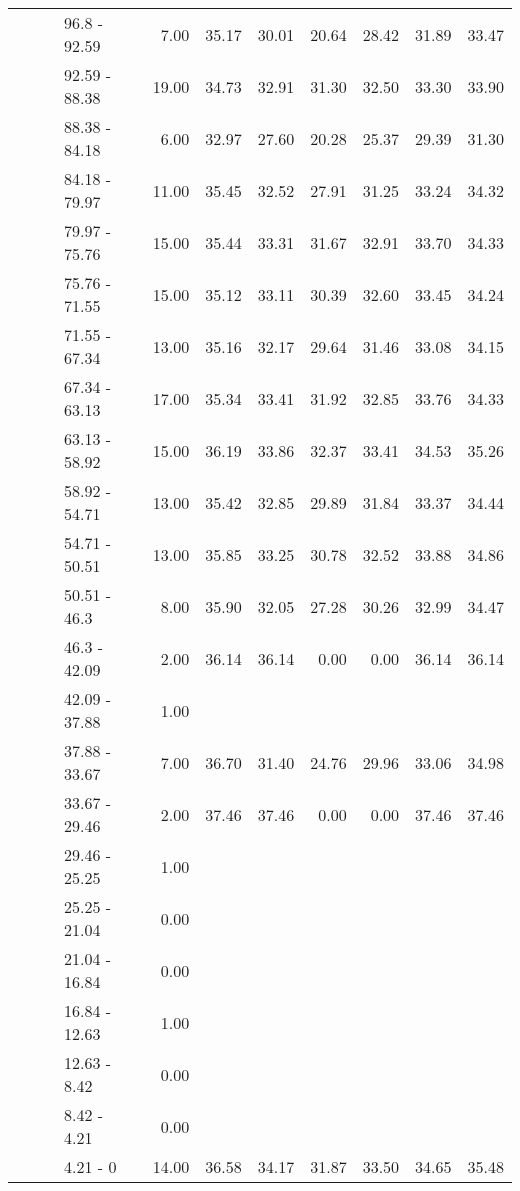 \begin{longtable}{llllrrrrrrr}
   &  &  & 96.8 - 92.59 & 7.00 & 35.17 & 30.01 & 20.64 & 28.42 & 31.89 & 33.47 \\ 
   &  &  & 92.59 - 88.38 & 19.00 & 34.73 & 32.91 & 31.30 & 32.50 & 33.30 & 33.90 \\ 
   &  &  & 88.38 - 84.18 & 6.00 & 32.97 & 27.60 & 20.28 & 25.37 & 29.39 & 31.30 \\ 
   &  &  & 84.18 - 79.97 & 11.00 & 35.45 & 32.52 & 27.91 & 31.25 & 33.24 & 34.32 \\ 
   &  &  & 79.97 - 75.76 & 15.00 & 35.44 & 33.31 & 31.67 & 32.91 & 33.70 & 34.33 \\ 
   &  &  & 75.76 - 71.55 & 15.00 & 35.12 & 33.11 & 30.39 & 32.60 & 33.45 & 34.24 \\ 
   &  &  & 71.55 - 67.34 & 13.00 & 35.16 & 32.17 & 29.64 & 31.46 & 33.08 & 34.15 \\ 
   &  &  & 67.34 - 63.13 & 17.00 & 35.34 & 33.41 & 31.92 & 32.85 & 33.76 & 34.33 \\ 
   &  &  & 63.13 - 58.92 & 15.00 & 36.19 & 33.86 & 32.37 & 33.41 & 34.53 & 35.26 \\ 
   &  &  & 58.92 - 54.71 & 13.00 & 35.42 & 32.85 & 29.89 & 31.84 & 33.37 & 34.44 \\ 
   &  &  & 54.71 - 50.51 & 13.00 & 35.85 & 33.25 & 30.78 & 32.52 & 33.88 & 34.86 \\ 
   &  &  & 50.51 - 46.3 & 8.00 & 35.90 & 32.05 & 27.28 & 30.26 & 32.99 & 34.47 \\ 
   &  &  & 46.3 - 42.09 & 2.00 & 36.14 & 36.14 & 0.00 & 0.00 & 36.14 & 36.14 \\ 
   &  &  & 42.09 - 37.88 & 1.00 &  &  &  &  &  &  \\ 
   &  &  & 37.88 - 33.67 & 7.00 & 36.70 & 31.40 & 24.76 & 29.96 & 33.06 & 34.98 \\ 
   &  &  & 33.67 - 29.46 & 2.00 & 37.46 & 37.46 & 0.00 & 0.00 & 37.46 & 37.46 \\ 
   &  &  & 29.46 - 25.25 & 1.00 &  &  &  &  &  &  \\ 
   &  &  & 25.25 - 21.04 & 0.00 &  &  &  &  &  &  \\ 
   &  &  & 21.04 - 16.84 & 0.00 &  &  &  &  &  &  \\ 
   &  &  & 16.84 - 12.63 & 1.00 &  &  &  &  &  &  \\ 
   &  &  & 12.63 - 8.42 & 0.00 &  &  &  &  &  &  \\ 
   &  &  & 8.42 - 4.21 & 0.00 &  &  &  &  &  &  \\ 
   &  &  & 4.21 - 0 & 14.00 & 36.58 & 34.17 & 31.87 & 33.50 & 34.65 & 35.48 \\ 

\end{longtable}
